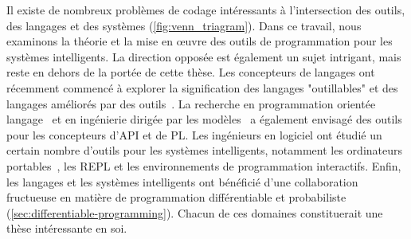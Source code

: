 Il existe de nombreux problèmes de codage intéressants à l'intersection des outils, des langages et des systèmes (\autoref{fig:venn_triagram}). Dans ce travail, nous examinons la théorie et la mise en œuvre des outils de programmation pour les systèmes intelligents. La direction opposée est également un sujet intrigant, mais reste en dehors de la portée de cette thèse. Les concepteurs de langages ont récemment commencé à explorer la signification des langages "outillables" et des langages améliorés par des outils~\citep{chatley2019next}. La recherche en programmation orientée langage~\citep{dmitriev2004language} et en ingénierie dirigée par les modèles~\citep{famelis2015mummint} a également envisagé des outils pour les concepteurs d'API et de PL. Les ingénieurs en logiciel ont étudié un certain nombre d'outils pour les systèmes intelligents, notamment les ordinateurs portables~\citep{chattopadhyays2020notebooks}, les REPL et les environnements de programmation interactifs. Enfin, les langages et les systèmes intelligents ont bénéficié d'une collaboration fructueuse en matière de programmation différentiable et probabiliste (\autoref{sec:differentiable-programming}). Chacun de ces domaines constituerait une thèse intéressante en soi.

